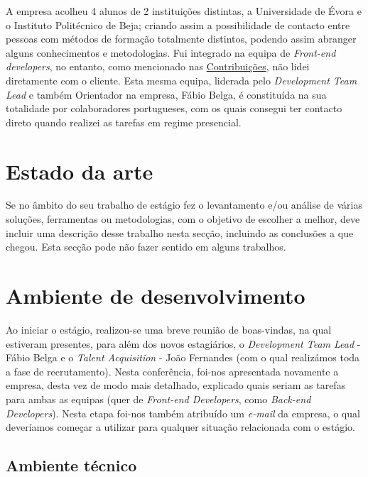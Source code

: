 \documentclass{article}
\begin{document}
\hspace*{0.5cm} A empresa acolheu 4 alunos de 2 instituições distintas, a Universidade de Évora e o Instituto Politécnico de Beja; criando assim a possibilidade de contacto entre pessoas com métodos de formação totalmente distintos, podendo assim abranger alguns conhecimentos e metodologias. Fui integrado na equipa de \emph{Front-end developers}, no entanto, como mencionado nas \hyperref[sec:cont]{Contribuições}, não lidei diretamente com o cliente. Esta mesma equipa, liderada pelo \emph{Development Team Lead} e também Orientador na empresa, Fábio Belga, é constituída na sua totalidade por colaboradores portugueses, com os quais consegui ter contacto direto quando realizei as tarefas em regime presencial. \newline

\cleardoublepage
\section{Estado da arte}
\label{sec:est-art}
Se no âmbito do seu trabalho de estágio fez o levantamento e/ou análise de várias soluções, ferramentas ou metodologias, com o objetivo de escolher a melhor, deve incluir uma descrição desse trabalho nesta secção, incluindo as conclusões a que chegou.
Esta secção pode não fazer sentido em alguns trabalhos.


\cleardoublepage
\section{Ambiente de desenvolvimento}
\label{sec:amb-dev}
\hspace*{0.5cm} Ao iniciar o estágio, realizou-se uma breve reunião de boas-vindas, na qual estiveram presentes, para além dos novos estagiários, o \emph{Development Team Lead} - Fábio Belga e o \emph{Talent Acquisition} - João Fernandes (com o qual realizámos toda a fase de recrutamento). Nesta conferência, foi-nos apresentada novamente a empresa, desta vez de modo mais detalhado, explicado quais seriam as tarefas para ambas as equipas (quer de \emph{Front-end Developers}, como \emph{Back-end Developers}). Nesta etapa foi-nos também atribuído um \emph{e-mail} da empresa, o qual deveríamos começar a utilizar para qualquer situação relacionada com o estágio. \newline

\subsection{Ambiente técnico}
\end{document}
